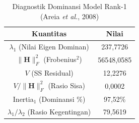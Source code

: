 \begin{table}[H]
\centering
\small
\caption{Diagnostik Dominansi Model Rank-1 (Areia \textit{et al.}, 2008)} \label{tab:app1struktur_diagnostik}
\begin{tabular}{|c|c|}
\hline
\textbf{Kuantitas} & \textbf{Nilai} \\
\hline
$\lambda_1$ (Nilai Eigen Dominan) & 237,7726 \\
$\|\mathbf{H}\|_F^2$ (Frobenius$^2$) & 56548,0585 \\
$V$ (SS Residual) & 12,2276 \\
$V / \|\mathbf{H}\|_F^2$ (Rasio Sisa) & 0,0002 \\
Inertia$_1$ (Dominansi \%) & 97,52\% \\
$\lambda_1 / \lambda_2$ (Rasio Kegentingan) & 79,5619 \\
\hline
\end{tabular}
\end{table}